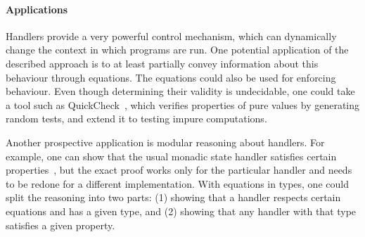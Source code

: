 \documentclass[a4paper,UKenglish]{dagrep}
\begin{document}
\paragraph*{Applications}
Handlers provide a very powerful control mechanism, which can dynamically change the context in which programs are run. One potential application of the described approach is to at least partially convey information about this behaviour through equations. The equations could also be used for enforcing behaviour. Even though determining their validity is undecidable, one could take a tool such as QuickCheck~\cite{DBLP:conf/icfp/ClaessenH00}, which verifies properties of pure values by generating random tests, and extend it to testing impure computations.

Another prospective application is modular reasoning about handlers. For example, one can show that the usual monadic state handler satisfies certain properties~\cite{DBLP:journals/corr/BauerP13}, but the exact proof works only for the particular handler and needs to be redone for a different implementation. With equations in types, one could split the reasoning into two parts: (1) showing that a handler respects certain equations and has a given type, and (2) showing that any handler with that type satisfies a given property.

% 
% 
\end{document}
